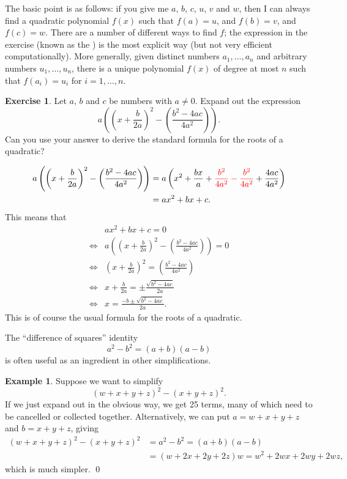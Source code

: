 \documentclass[a4paper]{book}
\theoremstyle{definition}
\newtheorem{example}[theorem]{Example}
\newtheorem{exercise}[theorem]{Exercise}
\renewenvironment{solution}{\SolutionInline}{\endSolutionInline}
\begin{document}
\begin{background}
 The basic point is as follows: if you give me $a$, $b$, $c$, $u$, $v$
 and $w$, then I can always find a quadratic polynomial $f(x)$ such
 that $f(a)=u$, and $f(b)=v$, and $f(c)=w$.  There are a number of
 different ways to find $f$; the expression in the exercise (known as
 the 
 ) is the most explicit way
 (but not very efficient computationally).  More generally, given
 distinct numbers $a_1,\ldots,a_n$ and arbitrary numbers
 $u_1,\ldots,u_n$, there is a unique polynomial $f(x)$ of degree at
 most $n$ such that $f(a_i)=u_i$ for $i=1,\ldots,n$.
\end{background}

\begin{exercise}
 Let $a$, $b$ and $c$ be numbers with $a\neq 0$.  Expand out the
 expression
 \[ a\left(\left(x+\frac{b}{2a}\right)^2 -
     \left(\frac{b^2-4ac}{4a^2}\right)\right).
 \]
 Can you use your answer to derive the standard formula for the roots
 of a quadratic?
\end{exercise}
\begin{solution}
 \begin{align*}
  a\left(\left(x+\frac{b}{2a}\right)^2 -
    \left(\frac{b^2-4ac}{4a^2}\right)\right) &=
   a\left( x^2 + \frac{bx}{a} +
           {\color{red} \frac{b^2}{4a^2} - \frac{b^2}{4a^2}}
            + \frac{4ac}{4a^2}\right) \\
    &= ax^2 + bx + c.
 \end{align*}
 This means that 
 \begin{align*}
       & ax^2 + bx + c = 0 \\
  \iff & a\left(\left(x+\frac{b}{2a}\right)^2 -
         \left(\frac{b^2-4ac}{4a^2}\right)\right) = 0 \\
  \iff & \left(x+\frac{b}{2a}\right)^2 =
         \left(\frac{b^2-4ac}{4a^2}\right) \\
  \iff & x+\frac{b}{2a} = \pm \frac{\sqrt{b^2-4ac}}{2a} \\
  \iff & x = \frac{-b \pm \sqrt{b^2-4ac}}{2a}.
 \end{align*}
 This is of course the usual formula for the roots of a quadratic.
\end{solution}


The ``difference of squares'' identity
\[ a^2 - b^2 = (a+b)(a-b) \]
is often useful as an ingredient in other simplifications.
\begin{example}
 Suppose we want to simplify
 \[ (w+x+y+z)^2 - (x+y+z)^2. \]
 If we just expand out in the obvious way, we get 25 terms, many of
 which need to be cancelled or collected together.  Alternatively, we
 can put $a=w+x+y+z$ and $b=x+y+z$, giving
 \begin{align*}
  (w+x+y+z)^2 - (x+y+z)^2 &= a^2-b^2 = (a+b)(a-b) \\
   &= (w+2x+2y+2z)w = w^2 + 2wx + 2wy + 2wz,
 \end{align*}
 which is much simpler. \qed
\end{example}
\end{document}
